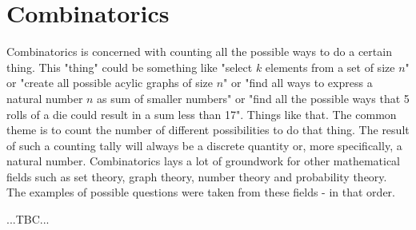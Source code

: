 \chapter{Combinatorics}
Combinatorics is concerned with counting all the possible ways to do a certain thing. This "thing" could be something like "select $k$ elements from a set of size $n$" or "create all possible acylic graphs of size $n$" or "find all ways to express a natural number $n$ as sum of smaller numbers" or "find all the possible ways that 5 rolls of a die could result in a sum less than 17". Things like that. The common theme is to count the number of different possibilities to do that thing. The result of such a counting tally will always be a discrete quantity or, more specifically, a natural number. Combinatorics lays a lot of groundwork for other mathematical fields such as set theory, graph theory, number theory and probability theory. The examples of possible questions were taken from these fields - in that order.

...TBC...

